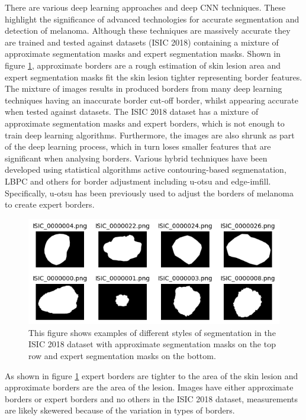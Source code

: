 There are various deep learning approaches\cite{Albahli2020} and deep CNN techniques\cite{yu2017}. These highlight the significance of advanced technologies for accurate segmentation and detection of melanoma. Although these techniques are massively accurate they are trained and tested against datasets (ISIC 2018) containing a mixture of approximate segmentation masks and expert segmentation masks. Shown in figure \ref{seg-expert}, approximate borders are a rough estimation of skin lesion area and expert segmentation masks fit the skin lesion tighter representing border features. The mixture of images results in produced borders from many deep learning techniques having an inaccurate border cut-off border, whilst appearing accurate when tested against datasets. The ISIC 2018 dataset has a mixture of approximate segmentation masks and expert borders, which is not enough to train deep learning algorithms. Furthermore, the images are also shrunk as part of the deep learning process, which in turn loses smaller features that are significant when analysing borders. Various hybrid techniques have been developed using statistical algorithms active contouring-based segmenatation\cite{Riaz2019}, LBPC and others for border adjustment including u-otsu and edge-imfill. Specifically, u-otsu has been previously used to adjust the borders of melanoma to create expert borders\cite{}.

\begin{figure}[]
    \centering
    \includegraphics[scale=0.9]{images/segmentation/seg-expert-approx.png}
    \caption{This figure shows examples of different styles of segmentation in the ISIC 2018 dataset with approximate segmentation masks on the top row and expert segmentation masks on the bottom.}\label{seg-expert}
\end{figure}

As shown in figure \ref{seg-expert} expert borders are tighter to the area of the skin lesion and approximate borders are the area of the lesion. Images have either approximate borders or expert borders and no others in the ISIC 2018 dataset, measurements are likely skewered because of the variation in types of borders.

